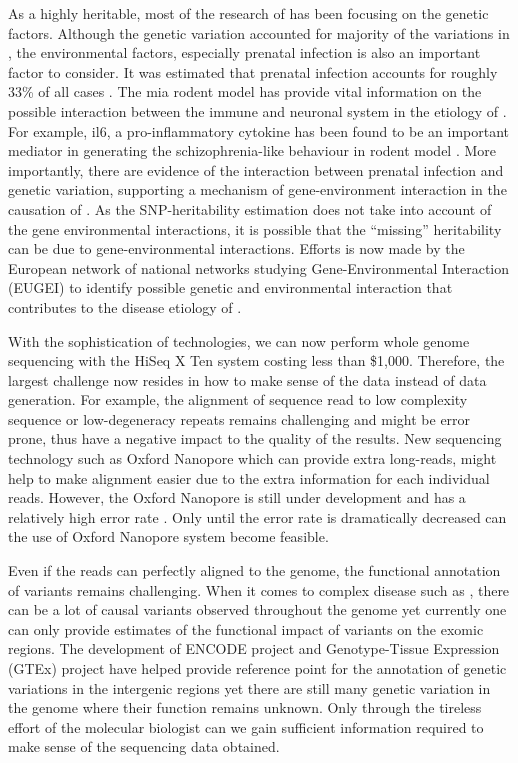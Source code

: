 \documentclass[12pt]{scrbook}
\newcommand*{\glng}{\glsentrylong}
\begin{document}
	As a highly heritable, most of the research of \glng{scz} has been focusing on the genetic factors. 
	Although the genetic variation accounted for majority of the variations in \glng{scz}, the environmental factors, especially prenatal infection is also an important factor to consider. 
	It was estimated that prenatal infection accounts for roughly 33\% of all \glng{scz} cases \citep{Brown2010}.
	The \gls{mia} rodent model has provide vital information on the possible interaction between the immune and neuronal system in the etiology of \glng{scz} \citep{Meyer2007a}.
	For example, \gls{il6}, a pro-inflammatory cytokine has been found to be an important mediator in generating the schizophrenia-like behaviour in rodent model \citep{Smith2007}.
	More importantly, there are evidence of the interaction between prenatal infection and genetic variation, supporting a mechanism of gene-environment interaction in the causation of \glng{scz} \citep{Clarke2009}.
	As the \gls{SNP}-heritability estimation does not take into account of the gene environmental interactions, it is possible that the ``missing'' heritability can be due to gene-environmental interactions. 
	Efforts is now made by the European network of national \glng{scz} networks studying Gene-Environmental Interaction (EUGEI) to identify possible genetic and environmental interaction that contributes to the disease etiology of \glng{scz}.
	
	
	With the sophistication of technologies, we can now perform whole genome sequencing with the HiSeq \RN{10} Ten system costing less than \$1,000. 
	Therefore, the largest challenge now resides in how to make sense of the data instead of data generation.
	For example, the alignment of sequence read to low complexity sequence or low-degeneracy repeats remains challenging and might be error prone, thus have a negative impact to the quality of the results\citep{Sims2014}. 
	New sequencing technology such as Oxford Nanopore which can provide extra long-reads, might help to make alignment easier due to the extra information for each individual reads.
	However, the Oxford Nanopore is still under development and has a relatively high error rate \citep{Mikheyev2014}. 
	Only until the error rate is dramatically decreased can the use of Oxford Nanopore system become feasible. 
	
	Even if the reads can perfectly aligned to the genome, the functional annotation of variants remains challenging.
	When it comes to complex disease such as \glng{scz}, there can be a lot of causal variants observed throughout the genome yet currently one can only provide estimates of the functional impact of variants on the exomic regions.
	The development of ENCODE project \citep{ENCODEProjectConsortium2012} and Genotype-Tissue Expression (GTEx) project \citep{Consortium2015} have helped provide reference point for the annotation of genetic variations in the intergenic regions yet there are still many genetic variation in the genome where their function remains unknown. 
	Only through the tireless effort of the molecular biologist can we gain sufficient information required to make sense of the sequencing data obtained.	
	
\end{document}
